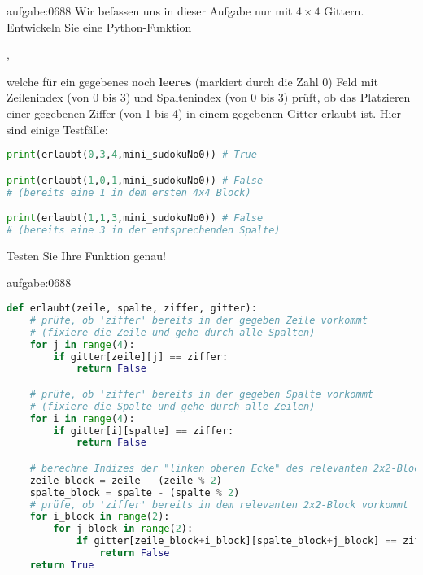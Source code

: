 \clearpage
\begin{aufgabe}{aufgabe:0688}
Wir befassen uns in dieser Aufgabe nur mit $4\times 4$ Gittern. Entwickeln Sie eine Python-Funktion
\begin{center}
  ,  
\end{center}
welche für ein gegebenes noch \textbf{leeres} (markiert durch die Zahl 0) Feld mit Zeilenindex  (von 0 bis 3) und Spaltenindex  (von 0 bis 3) prüft, ob das Platzieren einer gegebenen Ziffer  (von 1 bis 4) in einem gegebenen Gitter erlaubt ist. Hier sind einige Testfälle:
\begin{lstlisting}[language=Python,caption=erlaubt oder nicht,numbers=none]
print(erlaubt(0,3,4,mini_sudokuNo0)) # True

print(erlaubt(1,0,1,mini_sudokuNo0)) # False
# (bereits eine 1 in dem ersten 4x4 Block)

print(erlaubt(1,1,3,mini_sudokuNo0)) # False
# (bereits eine 3 in der entsprechenden Spalte)
\end{lstlisting}
Testen Sie Ihre Funktion genau!
\end{aufgabe}
\lstset{basicstyle=\ttfamily\footnotesize}
\begin{antwort}{aufgabe:0688}
\begin{lstlisting}[language=Python,caption=Implementation der Funktion \pythoninline{erlaubt}]
def erlaubt(zeile, spalte, ziffer, gitter):
	# prüfe, ob 'ziffer' bereits in der gegeben Zeile vorkommt
	# (fixiere die Zeile und gehe durch alle Spalten)
	for j in range(4):
		if gitter[zeile][j] == ziffer:
			return False

	# prüfe, ob 'ziffer' bereits in der gegeben Spalte vorkommt
	# (fixiere die Spalte und gehe durch alle Zeilen)
	for i in range(4):
		if gitter[i][spalte] == ziffer:
			return False

	# berechne Indizes der "linken oberen Ecke" des relevanten 2x2-Blocks
	zeile_block = zeile - (zeile % 2)
	spalte_block = spalte - (spalte % 2)
	# prüfe, ob 'ziffer' bereits in dem relevanten 2x2-Block vorkommt
	for i_block in range(2):
		for j_block in range(2):
			if gitter[zeile_block+i_block][spalte_block+j_block] == ziffer:
				return False
	return True
\end{lstlisting}
\lstset{style=mystyle}
\end{antwort}


